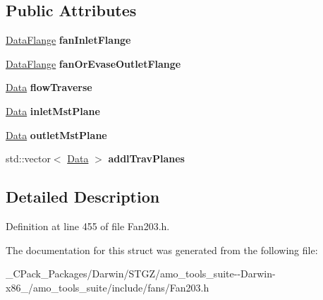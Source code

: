 \subsection*{Public Attributes}
\begin{DoxyCompactItemize}
\item 
\mbox{\label{struct_plane_data_1_1_node_binding_1_1_output_a1e03cb2e19c2b0284f75df5cdf065675}} 
\hyperlink{struct_plane_data_1_1_node_binding_1_1_data_flange}{Data\+Flange} {\bfseries fan\+Inlet\+Flange}
\item 
\mbox{\label{struct_plane_data_1_1_node_binding_1_1_output_af07f4acd58bb66b2c9c1b887427d2fbb}} 
\hyperlink{struct_plane_data_1_1_node_binding_1_1_data_flange}{Data\+Flange} {\bfseries fan\+Or\+Evase\+Outlet\+Flange}
\item 
\mbox{\label{struct_plane_data_1_1_node_binding_1_1_output_a5dfaab5fc6ebed9f699191eb3903a97e}} 
\hyperlink{struct_plane_data_1_1_node_binding_1_1_data}{Data} {\bfseries flow\+Traverse}
\item 
\mbox{\label{struct_plane_data_1_1_node_binding_1_1_output_afdb50efd9bba21241d822a10cc8b804c}} 
\hyperlink{struct_plane_data_1_1_node_binding_1_1_data}{Data} {\bfseries inlet\+Mst\+Plane}
\item 
\mbox{\label{struct_plane_data_1_1_node_binding_1_1_output_a7ca28948b57ea956833151a20f446ea1}} 
\hyperlink{struct_plane_data_1_1_node_binding_1_1_data}{Data} {\bfseries outlet\+Mst\+Plane}
\item 
\mbox{\label{struct_plane_data_1_1_node_binding_1_1_output_aee139722930a59d1be944bd1f56365a3}} 
std\+::vector$<$ \hyperlink{struct_plane_data_1_1_node_binding_1_1_data}{Data} $>$ {\bfseries addl\+Trav\+Planes}
\end{DoxyCompactItemize}


\subsection{Detailed Description}


Definition at line 455 of file Fan203.\+h.



The documentation for this struct was generated from the following file\+:\begin{DoxyCompactItemize}
\item 
\+\_\+\+C\+Pack\+\_\+\+Packages/\+Darwin/\+S\+T\+G\+Z/amo\+\_\+tools\+\_\+suite-\/-\/\+Darwin-\/x86\+\_/amo\+\_\+tools\+\_\+suite/include/fans/Fan203.\+h\end{DoxyCompactItemize}
